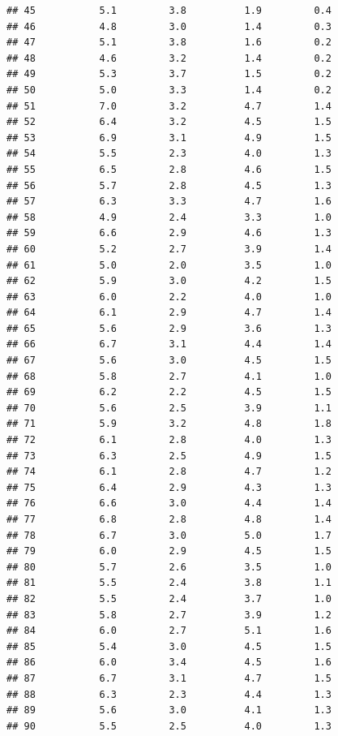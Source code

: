 \documentclass[]{book}
\theoremstyle{definition}
\theoremstyle{definition}
\theoremstyle{definition}
\theoremstyle{remark}
\begin{document}
\begin{verbatim}
## 45           5.1         3.8          1.9         0.4
## 46           4.8         3.0          1.4         0.3
## 47           5.1         3.8          1.6         0.2
## 48           4.6         3.2          1.4         0.2
## 49           5.3         3.7          1.5         0.2
## 50           5.0         3.3          1.4         0.2
## 51           7.0         3.2          4.7         1.4
## 52           6.4         3.2          4.5         1.5
## 53           6.9         3.1          4.9         1.5
## 54           5.5         2.3          4.0         1.3
## 55           6.5         2.8          4.6         1.5
## 56           5.7         2.8          4.5         1.3
## 57           6.3         3.3          4.7         1.6
## 58           4.9         2.4          3.3         1.0
## 59           6.6         2.9          4.6         1.3
## 60           5.2         2.7          3.9         1.4
## 61           5.0         2.0          3.5         1.0
## 62           5.9         3.0          4.2         1.5
## 63           6.0         2.2          4.0         1.0
## 64           6.1         2.9          4.7         1.4
## 65           5.6         2.9          3.6         1.3
## 66           6.7         3.1          4.4         1.4
## 67           5.6         3.0          4.5         1.5
## 68           5.8         2.7          4.1         1.0
## 69           6.2         2.2          4.5         1.5
## 70           5.6         2.5          3.9         1.1
## 71           5.9         3.2          4.8         1.8
## 72           6.1         2.8          4.0         1.3
## 73           6.3         2.5          4.9         1.5
## 74           6.1         2.8          4.7         1.2
## 75           6.4         2.9          4.3         1.3
## 76           6.6         3.0          4.4         1.4
## 77           6.8         2.8          4.8         1.4
## 78           6.7         3.0          5.0         1.7
## 79           6.0         2.9          4.5         1.5
## 80           5.7         2.6          3.5         1.0
## 81           5.5         2.4          3.8         1.1
## 82           5.5         2.4          3.7         1.0
## 83           5.8         2.7          3.9         1.2
## 84           6.0         2.7          5.1         1.6
## 85           5.4         3.0          4.5         1.5
## 86           6.0         3.4          4.5         1.6
## 87           6.7         3.1          4.7         1.5
## 88           6.3         2.3          4.4         1.3
## 89           5.6         3.0          4.1         1.3
## 90           5.5         2.5          4.0         1.3

\end{verbatim}
\end{document}
